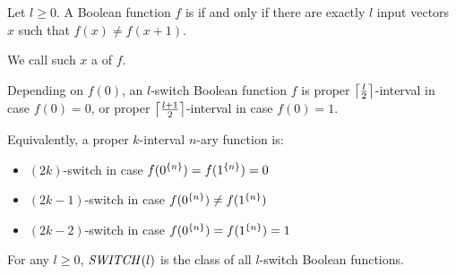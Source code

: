 \begin{definition}
Let $l \geq 0$.
A Boolean function $f$ is 
if and only if
there are exactly $l$ input vectors $x$ such that
$f(x) \neq f(x+1)$.

We call such $x$ a  of $f$.
\end{definition}

\begin{example}
\label{example:switchesintervals}
Depending on $f(0)$,
an $l$-switch Boolean function $f$
is proper $\ceil*{\frac{l}{2}}$-interval
in case $f(0) = 0$,
or proper $\ceil*{\frac{l+1}{2}}$-interval
in case $f(0) = 1$.

Equivalently,
a proper $k$-interval $n$-ary function is:
\begin{itemize}
\item
$(2k)$-switch in case $f(\rep{0}{n}) = f(\rep{1}{n}) = 0$
\item
$(2k-1)$-switch in case $f(\rep{0}{n}) \neq f(\rep{1}{n})$
\item
$(2k-2)$-switch in case $f(\rep{0}{n}) = f(\rep{1}{n}) = 1$
\end{itemize}
\end{example}


\begin{definition}
[$\switchfns{l}$]
\label{def:switchfns}
For any $l \geq 0$,
$\switchfns{l}$ is the class
of all $l$-switch Boolean functions.
\end{definition}
